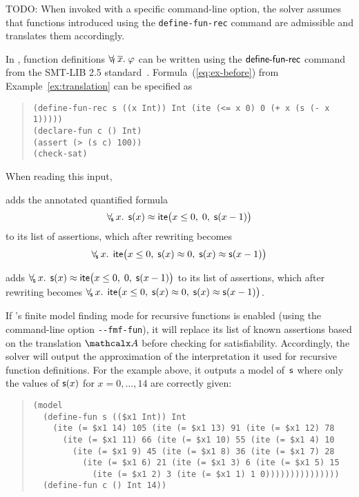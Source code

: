 TODO:
When invoked with a specific
command-line option, the solver assumes that functions introduced using the
\texttt{define-fun-rec} command are admissible and translates them accordingly.

In \cvc, function definitions $\forall_{\!\mathsf{f}\:} \overline{x}.\; \varphi$ can be written using the $\mathsf{define}\text{-}\mathsf{fun}\text{-}\mathsf{rec}$ command
from the SMT-LIB 2.5 standard~\cite{smtlib25}.
Formula~(\ref{eq:ex-before}) from Example~\ref{ex:translation}
can be specified as %
%
\begin{quote}
\begin{verbatim}
(define-fun-rec s ((x Int)) Int (ite (<= x 0) 0 (+ x (s (- x 1)))))
(declare-fun c () Int)
(assert (> (s c) 100))
(check-sat)
\end{verbatim}
\end{quote}
%
When reading this input,
\begin{rep}%
\cvc adds the annotated quantified formula
$$\forall_{\!\mathsf{s}\:} x.\;\, \mathsf{s}( x ) \approx \mathsf{ite}\bigl( x \leq 0,\; 0,\; \mathsf{s}( x-1 )\bigr)$$
to its list of assertions,
which after rewriting becomes
$$\forall_{\!\mathsf{s}\:} x.\;\, \mathsf{ite}\bigl( x \leq 0,\; \mathsf{s}( x ) \approx 0,\; \mathsf{s}( x ) \approx \mathsf{s}( x-1 ) \bigr)$$
\end{rep}%
\begin{conf}%
\cvc adds
$\forall_{\!\mathsf{s}\:} x.\;\, \mathsf{s}( x ) \approx \mathsf{ite}\bigl( x \leq 0,\; 0,\; \mathsf{s}( x-1 )\bigr)$
to its list of assertions,
which after rewriting becomes
$\forall_{\!\mathsf{s}\:} x.\;\, \mathsf{ite}\bigl( x \leq 0,\; \mathsf{s}( x ) \approx 0,\; \mathsf{s}( x ) \approx \mathsf{s}( x-1 ) \bigr)$. \end{conf}%
If \cvc's finite model finding mode for recursive functions is enabled (using
the command-line option \texttt{-}\texttt{-fmf-fun}), it will replace its list of known
assertions based on the translation $\conv$ before checking for satisfiability.
Accordingly, the solver will output the approximation of the interpretation it
used for recursive function definitions. 
For the example above, it outputs a %
model of~$\mathsf{s}$ where only
the values of $\mathsf{s}(x)$ for $x = 0,\ldots,14$ are correctly given:
\begin{quote}
\begin{verbatim}
(model
  (define-fun s (($x1 Int)) Int 
    (ite (= $x1 14) 105 (ite (= $x1 13) 91 (ite (= $x1 12) 78 
      (ite (= $x1 11) 66 (ite (= $x1 10) 55 (ite (= $x1 4) 10 
        (ite (= $x1 9) 45 (ite (= $x1 8) 36 (ite (= $x1 7) 28 
          (ite (= $x1 6) 21 (ite (= $x1 3) 6 (ite (= $x1 5) 15 
            (ite (= $x1 2) 3 (ite (= $x1 1) 1 0)))))))))))))))
  (define-fun c () Int 14))
\end{verbatim}
\end{quote}

